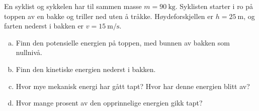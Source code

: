 %
En syklist og sykkelen har til sammen masse $m = \SI{90}{\kilo\gram}$. Syklisten starter i ro på toppen av en bakke og triller ned uten å tråkke. Høydeforskjellen er $h = \SI{25}{\metre}$, og farten nederst i bakken er $v = \SI{15}{\metre\per\second}$.
\begin{enumerate}[a)]
    \item Finn den potensielle energien på toppen, med bunnen av bakken som nullnivå.
    \item Finn den kinetiske energien nederst i bakken.
    \item Hvor mye mekanisk energi har gått tapt? Hvor har denne energien blitt av?
    \item Hvor mange prosent av den opprinnelige energien gikk tapt?
\end{enumerate}
